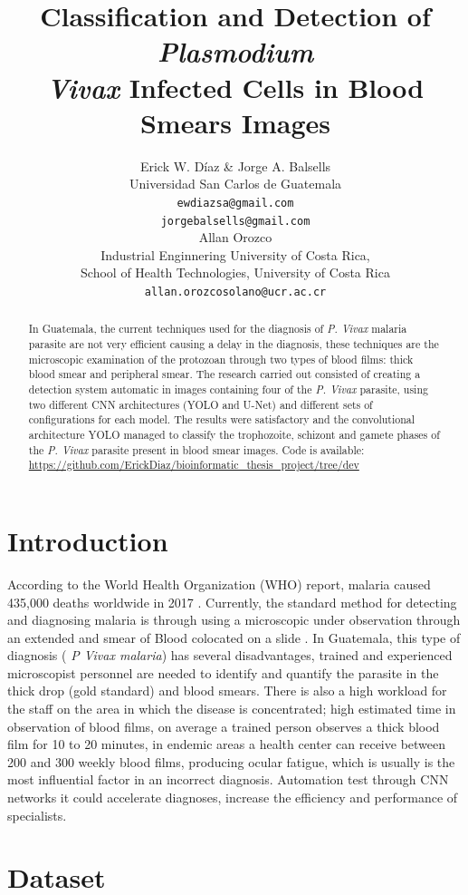 \documentclass{article} %
\title{Classification and Detection of  \textit{Plasmodium \\ Vivax} Infected Cells in  Blood Smears Images}
\author{Erick W. D\'iaz \& Jorge A. Balsells\\
Universidad San Carlos de Guatemala \\ 
\texttt{ewdiazsa@gmail.com} \\
\texttt{jorgebalsells@gmail.com} \\
\And  Allan Orozco \\
Industrial Enginnering University of Costa Rica, \\
School of Health Technologies, University of Costa Rica \\
\texttt{allan.orozcosolano@ucr.ac.cr}
}
\begin{document}
\maketitle

\begin{abstract}
In Guatemala, the current techniques used for the diagnosis of \textit{P. Vivax} malaria parasite are not very efficient causing a delay in the diagnosis, these techniques are the microscopic examination of the protozoan through two types of blood films: thick blood smear and peripheral smear.  The research carried out consisted of creating a detection system automatic in images containing four of the \textit{P. Vivax} parasite, using two different CNN architectures (YOLO and U-Net) and different sets of configurations for each model. The results were satisfactory and the convolutional architecture YOLO managed to classify the trophozoite, schizont and gamete phases of the \textit{P. Vivax} parasite present in blood smear images. Code is available: \url{https://github.com/ErickDiaz/bioinformatic_thesis_project/tree/dev}
\end{abstract}


\section{Introduction}
According to the World Health Organization (WHO) report, malaria caused 435,000 deaths worldwide in 2017 . Currently, the standard method for detecting and diagnosing malaria is through using a microscopic under observation through an extended and smear of Blood colocated on a slide . In Guatemala, this type of diagnosis ( \textit{P Vivax malaria}) has several disadvantages, trained and experienced microscopist personnel are needed to identify and quantify the parasite in the thick drop (gold standard) and blood smears. There is also a high workload for the staff on the area in which the disease is concentrated; high estimated time in observation of blood films, on average a trained person observes a thick blood film for 10 to 20 minutes, in endemic areas a health center can receive between 200 and 300 weekly blood films, producing ocular fatigue, which is usually is the most influential factor in an incorrect diagnosis. Automation test through CNN networks it could accelerate diagnoses, increase the efficiency and performance of specialists.


\section{Dataset}
\end{document}
